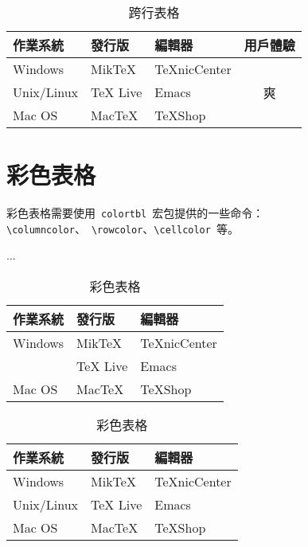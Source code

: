 \begin{table}[htbp]
\caption{跨行表格}
\centering
\begin{tabular}{lllc}
    \toprule
    作業系統 & 發行版 & 編輯器 & 用戶體驗 \\
    \midrule
    Windows & MikTeX & TeXnicCenter & 
    \multirow{3}{*}{\centering 爽} \\
    Unix/Linux & TeX Live & Emacs \\
    Mac OS & MacTeX & TeXShop \\
    \bottomrule
\end{tabular}
\end{table}

\section{彩色表格}
彩色表格需要使用~\verb|colortbl|~宏包\citep{Carlisle_2001}提供的一些命令：\verb|\columncolor|、~\verb|\rowcolor|、\verb|\cellcolor|~等。
\begin{code}
\usepackage{colortbl}
...
\begin{table}[htbp]
\caption{彩色表格}
\centering
\begin{tabular}{lll}
    \toprule
    作業系統 & 發行版 & 編輯器 \\
    \midrule
    Windows & MikTeX & TeXnicCenter \\
\end{code}
\begin{code}
    \rowcolor[gray]{.8} Unix/Linux & TeX Live & Emacs \\
    Mac OS & MacTeX & TeXShop \\
    \bottomrule
\end{tabular}
\end{table}
\end{code}

\begin{table}[htbp]
\caption{彩色表格}
\centering
\begin{tabular}{lll}
    \toprule
    作業系統 & 發行版 & 編輯器 \\
    \midrule
    Windows & MikTeX & TeXnicCenter \\
    \rowcolor[gray]{.8} Unix/Linux & TeX Live & Emacs \\
    Mac OS & MacTeX & TeXShop \\
    \bottomrule
\end{tabular}
\end{table}

